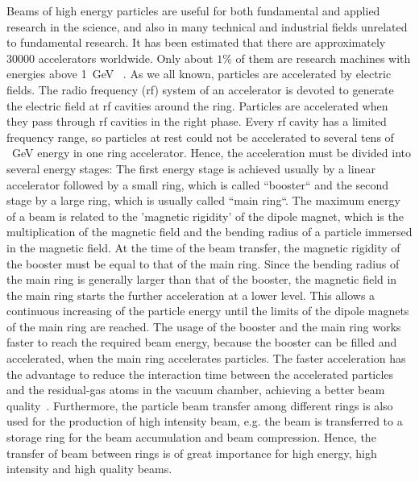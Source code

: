 %

Beams of high energy particles are useful for both fundamental and applied research in the science, and also in many technical and industrial fields unrelated to fundamental research. It has been estimated that there are approximately 30000 accelerators worldwide. Only about $1\%$ of them are research machines with energies above \SI{1}{GeV} ~\cite{noauthor_particle_2017}.  As we all known, particles are accelerated by electric fields. The radio frequency (rf) system of an accelerator is devoted to generate the electric field at rf cavities around the ring. Particles are accelerated when they pass through rf cavities in the right phase. Every rf cavity has a limited frequency range,  so particles at rest could not be accelerated to several tens of \SI{}{GeV} energy in one ring accelerator.  Hence, the acceleration must be divided into several energy stages: The first energy stage is achieved usually by a linear accelerator followed by a small ring, which is called ``booster`` and the second stage by a large ring, which is usually called ``main ring``.  The maximum energy of a beam is related to the 'magnetic rigidity' of the dipole magnet, which is the multiplication of the magnetic field and the bending radius of a particle immersed in the magnetic field. At the time of the beam transfer, the magnetic rigidity of the booster must be equal to that of the main ring. Since the bending radius of the main ring is generally larger than that of the booster, the magnetic field in the main ring starts the further acceleration at a lower level. This allows a continuous increasing of the particle energy until the limits of the dipole magnets of the main ring are reached. The usage of the booster and the main ring works faster to reach the required beam energy, because the booster can be filled and accelerated, when the main ring accelerates particles. The faster acceleration has the advantage to reduce the interaction time between the accelerated particles and the residual-gas atoms in the vacuum chamber, achieving a better beam quality~\cite{moller_beam-residual_1999}. Furthermore, the particle beam transfer among different rings is also used for the production of high intensity beam, e.g. the beam is transferred to a storage ring for the beam accumulation and beam compression. Hence, the transfer of beam between rings is of great importance for high energy, high intensity and high quality beams.


